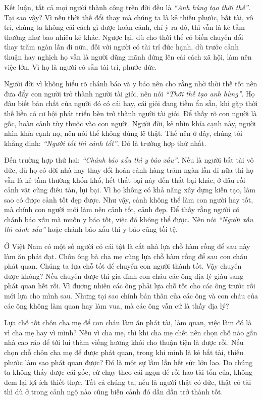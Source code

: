 \documentclass[
  12pt,
  oneside]{book}
\begin{document}
Kết luận, tất cả mọi người thành công trên đời đều là \emph{``Anh hùng tạo thời thế''}. Tại sao vậy? Vì nếu thời thế đổi thay mà chúng ta là kẻ thiếu phước, bất tài, vô trí, chúng ta không cải cách gì được hoàn cảnh, chỉ ỳ ra đó, thì vẫn là kẻ tầm thường như bao nhiêu kẻ khác. Ngược lại, dù cho thời thế có biến chuyển đổi thay trăm ngàn lần đi nữa, đối với người có tài trí đức hạnh, dù trước cảnh thuận hay nghịch họ vẫn là người dũng mãnh đứng lên cải cách xã hội, làm nên việc lớn. Vì họ là người có sẵn tài trí, phước đức.

Người đời vì không hiểu rõ chánh báo và y báo nên cho rằng nhờ thời thế tốt nên đưa đẩy con người trở thành người tài giỏi, nên nói \emph{``Thời thế tạo anh hùng''}. Họ đâu biết bản chất của người đó có cái hay, cái giỏi đang tiềm ẩn sẵn, khi gặp thời thế liền có cơ hội phát triển bèn trở thành người tài giỏi. Để thấy rõ con người là gốc, hoàn cảnh tùy thuộc vào con người. Người đời, kẻ nhìn khía cạnh này, người nhìn khía cạnh nọ, nên nói thế không đúng lẽ thật. Thế nên ở đây, chúng tôi khẳng định: \emph{``Người tốt thì cảnh tốt''}. Đó là trường hợp thứ nhất.

Đến trường hợp thứ hai: \emph{``Chánh báo xấu thì y báo xấu''}. Nếu là người bất tài vô đức, dù họ có dời nhà hay thay đổi hoàn cảnh hàng trăm ngàn lần đi nữa thì họ vẫn là kẻ tầm thường khốn khổ, hết thất bại này đến thất bại khác, ở đâu rồi cảnh vật cũng điêu tàn, lụi bại. Vì họ không có khả năng xây dựng kiến tạo, làm sao có được cảnh tốt đẹp được. Như vậy, cảnh không thể làm con người hay tốt, mà chính con người mới làm nên cảnh tốt, cảnh đẹp. Để thấy rằng người có chánh báo xấu mà muốn y báo tốt, việc đó không thể được. Nên nói \emph{``Người xấu thì cảnh xấu''} hoặc chánh báo xấu thì y báo cũng tồi tệ.

Ở Việt Nam có một số người có cái tật là cất nhà lựa chỗ hàm rồng để sau này làm ăn phát đạt. Chôn ông bà cha mẹ cũng lựa chỗ hàm rồng để sau con cháu phát quan. Chúng ta lựa chỗ tốt để chuyển con người thành tốt. Vậy chuyển được không? Nếu chuyển được thì gia đình con cháu các ông địa lý giàu sang phát quan hết rồi. Vì đương nhiên các ông phải lựa chỗ tốt cho các ông trước rồi mới lựa cho mình sau. Nhưng tại sao chính bản thân của các ông và con cháu của các ông không làm quan hay làm vua, mà các ông vẫn cứ là thầy địa lý?

Lựa chỗ tốt chôn cha mẹ để con cháu làm ăn phát tài, làm quan, việc làm đó là vì cha mẹ hay vì mình? Nếu vì cha mẹ, thì khi cha mẹ chết nên chọn chỗ nào gần nhà cao ráo để tới lui thăm viếng hương khói cho thuận tiện là được rồi. Nếu chọn chỗ chôn cha mẹ để được phát quan, trong khi mình là kẻ bất tài, thiếu phước làm sao phát quan được? Đó là một sự lầm lẫn hết sức lớn lao. Do chúng ta không thấy được cái gốc, cứ chạy theo cái ngọn để rồi hao tài tốn của, không đem lại lợi ích thiết thực. Tất cả chúng ta, nếu là người thật có đức, thật có tài thì dù ở trong cảnh ngộ nào cũng biến cảnh đó dần dần trở thành tốt.
\end{document}
